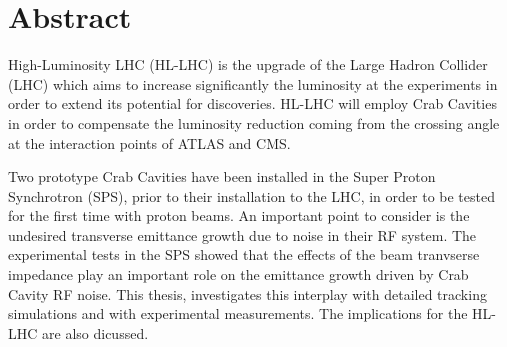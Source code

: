\cleardoublepage
\chapter*{Abstract}

High-Luminosity LHC (HL-LHC) is the upgrade of the Large Hadron Collider (LHC) which aims to increase significantly the luminosity at the experiments in order to extend its potential for discoveries. HL-LHC will employ Crab Cavities in order to compensate the luminosity reduction coming from the crossing angle at the interaction points of ATLAS and CMS. 

Two prototype Crab Cavities have been installed in the Super Proton Synchrotron (SPS), prior to their installation to the LHC, in order to be tested for the first time with proton beams. An important point to consider is the undesired transverse emittance growth due to noise in their RF system. The experimental tests in the SPS showed that the effects of the beam tranvserse impedance play an important role on the emittance growth driven by Crab Cavity RF noise. This thesis, investigates this interplay with detailed tracking simulations and with experimental measurements. The implications for the HL-LHC are also dicussed.








